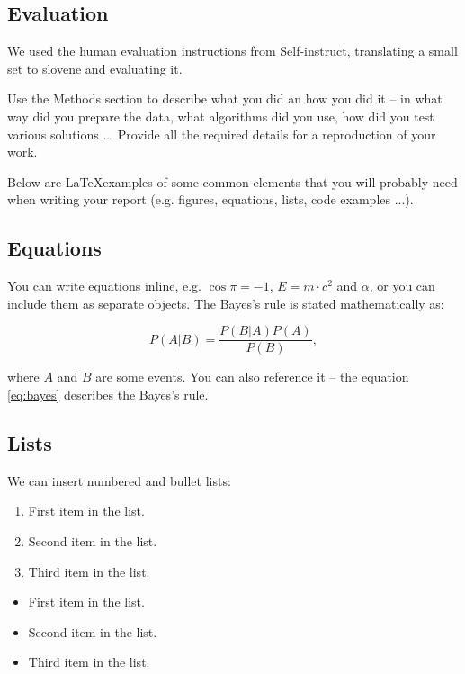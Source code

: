 \documentclass[fleqn,moreauthors,10pt]{ds_report}
\begin{document}
\subsection*{Evaluation}

We used the human evaluation instructions from Self-instruct\cite{wang2023selfinstruct}, translating a small set to slovene and evaluating it.

\iffalse
Use the Methods section to describe what you did an how you did it -- in what way did you prepare the data, what algorithms did you use, how did you test various solutions ... Provide all the required details for a reproduction of your work.

Below are \LaTeX examples of some common elements that you will probably need when writing your report (e.g. figures, equations, lists, code examples ...).


\subsection*{Equations}

You can write equations inline, e.g. $\cos\pi=-1$, $E = m \cdot c^2$ and $\alpha$, or you can include them as separate objects. The Bayes’s rule is stated mathematically as:

\begin{equation}
	P(A|B) = \frac{P(B|A)P(A)}{P(B)},
	\label{eq:bayes}
\end{equation}

where $A$ and $B$ are some events. You can also reference it -- the equation \ref{eq:bayes} describes the Bayes's rule.

\subsection*{Lists}

We can insert numbered and bullet lists:

\begin{enumerate}[noitemsep] 
	\item First item in the list.
	\item Second item in the list.
	\item Third item in the list.
\end{enumerate}

\begin{itemize}[noitemsep] 
	\item First item in the list.
	\item Second item in the list.
	\item Third item in the list.
\end{itemize}
\end{document}
